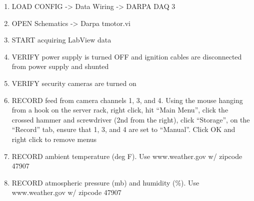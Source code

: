 \begin{enumerate}
    \item LOAD CONFIG -> Data Wiring -> DARPA DAQ 3
    \item OPEN Schematics -> Darpa tmotor.vi
    \item START acquiring LabView data
    \item VERIFY power supply is turned OFF and ignition cables are disconnected from power supply and shunted
    \item VERIFY security cameras are turned on
    \item RECORD feed from camera channels 1, 3, and 4. Using the mouse hanging from a hook on the server rack, right click, hit ``Main Menu'', click the crossed hammer and screwdriver (2nd from the right), click ``Storage'', on the ``Record'' tab, ensure that 1, 3, and 4 are set to ``Manual''. Click OK and right click to remove menus
    \item RECORD ambient temperature (deg F). Use www.weather.gov w/ zipcode 47907
    \item RECORD atmospheric pressure (mb) and humidity (\%). Use www.weather.gov w/ zipcode 47907
\end{enumerate}

